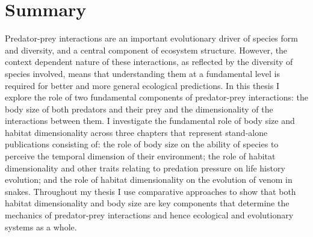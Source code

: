 \chapter*{Summary}

Predator-prey interactions are an important evolutionary driver of species form and diversity, and a central component of ecosystem structure. However, the context dependent nature of these interactions, as reflected by the diversity of species involved, means that understanding them at a fundamental level is required for better and more general ecological predictions. In this thesis I explore the role of two fundamental components of predator-prey interactions: the body size of both predators and their prey and the dimensionality of the interactions between them. I investigate the fundamental role of body size and habitat dimensionality across three chapters that represent stand-alone publications consisting of: the role of body size on the ability of species to perceive the temporal dimension of their environment; the role of habitat dimensionality and other traits relating to predation pressure on life history evolution; and the role of habitat dimensionality on the evolution of venom in snakes. Throughout my thesis I use comparative approaches to show that both habitat dimensionality and body size are key components that determine the mechanics of predator-prey interactions and hence ecological and evolutionary systems as a whole.


